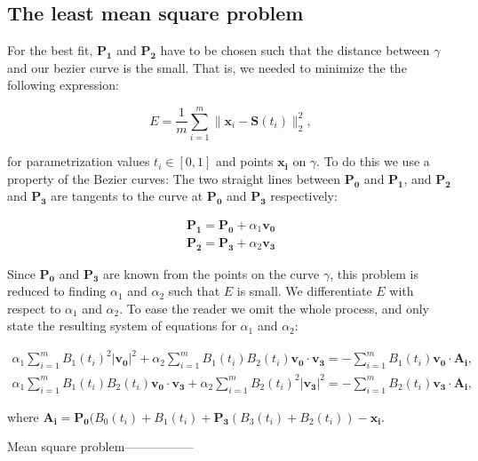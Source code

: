 \documentclass[10pt]{article}
\begin{document}
\subsection*{The least mean square problem}

For the best fit, $\mathbf{P_1}$ and $\mathbf{P_2}$ have to be chosen such that the distance between $\gamma$ and our bezier curve is the small. That is, we needed to minimize the the following expression:

\begin{equation}
E = \frac{1}{m} \sum_{i=1}^{m} \| \mathbf{x}_i - \mathbf{S}(t_i)\|^2_2,
\end{equation}

for parametrization values $t_i \in [ 0,1 ]$ and points $\mathbf{x_i}$ on $\gamma$. To do this we use a property of the Bezier curves: The two straight lines between $\mathbf{P_0}$ and $\mathbf{P_1}$, and $\mathbf{P_2}$ and $\mathbf{P_3}$ are tangents to the curve at $\mathbf{P_0}$ and $\mathbf{P_3}$ respectively:

\begin{align}
\mathbf{P_1} = \mathbf{P_0} + \alpha_1 \mathbf{v_0} \\
\mathbf{P_2} = \mathbf{P_3} + \alpha_2 \mathbf{v_3}
\end{align}

Since $\mathbf{P_0}$ and $\mathbf{P_3}$ are known from the points on the curve $\gamma$, this problem is reduced to finding $\alpha_1$ and $\alpha_2$ such that $E$ is small. We differentiate $E$ with respect to $\alpha_1$ and $\alpha_2$. To ease the reader we omit the whole process, and only state the resulting system of equations for $\alpha_1$ and $\alpha_2$:

\begin{align}
\alpha_1 \sum_{i = 1}^m B_1(t_i)^2 |\mathbf{v_0}|^2 + \alpha_2 \sum_{i = 1}^m B_1(t_i)B_2(t_i)\mathbf{v_0} \cdot \mathbf{v_3} 
= - \sum_{i = 1}^m B_1(t_i) \mathbf{v_0} \cdot \mathbf{A_i}, \\
\alpha_1 \sum_{i = 1}^m B_1(t_i)B_2(t_i)\mathbf{v_0} \cdot \mathbf{v_3} + \alpha_2 \sum_{i = 1}^m B_2(t_i)^2 |\mathbf{v_3}|^2 
= - \sum_{i = 1}^m B_2(t_i)\mathbf{v_3} \cdot \mathbf{A_i},
\end{align}

where $\mathbf{A_i} = \mathbf{P_0}(B_0(t_i) + B_1(t_i) + \mathbf{P_3}(B_3(t_i) + B_2(t_i)) - \mathbf{x_i}$.




Mean square problem-----------------
\end{document}
